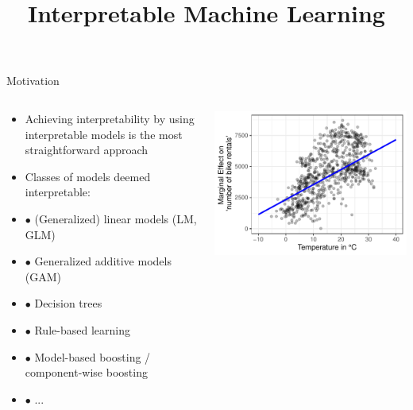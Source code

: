 \documentclass[11pt,compress,t,notes=noshow, aspectratio=169, xcolor=table]{beamer}
\title{Interpretable Machine Learning}
\date{}
\begin{document}
 

\newcommand{\titlefigure}{figure/whitebox}
\newcommand{\learninggoals}{
\item Why should we use interpretable models?
\item Advantages and disadvantages of interpretable models
}


\begin{frame}{Motivation}
\begin{columns}[T, totalwidth = \linewidth]
    \begin{column}{0.55\textwidth}
    \begin{itemize}
       \item Achieving interpretability by using interpretable models is the most straightforward approach
        \bigskip
        \item Classes of models deemed interpretable:
            \item[] $\bullet$ (Generalized) linear models (LM, GLM)
            \item[] $\bullet$ Generalized additive models (GAM)
            \item[] $\bullet$ Decision trees
            \item[] $\bullet$ Rule-based learning
            \item[] $\bullet$ Model-based boosting / component-wise boosting
            \item[] $\bullet$ ...
    \end{itemize}
    \end{column}
    \begin{column}{0.44\textwidth}  %
  \includegraphics[width = \textwidth]{figure/main_effect_lm_temp.pdf}

\end{column}
\end{columns}
\end{frame}
\end{document}
